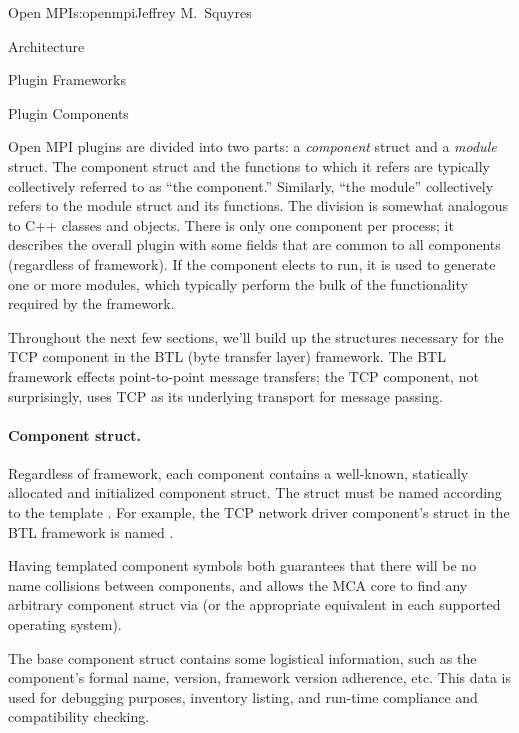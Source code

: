 \begin{aosachapter}{Open MPI}{s:openmpi}{Jeffrey M.\ Squyres}
\begin{aosasect1}{Architecture}
\begin{aosasect2}{Plugin Frameworks}
\end{aosasect2}


\begin{aosasect2}{Plugin Components}

Open MPI plugins are divided into two parts: a \emph{component}
struct and a \emph{module} struct.
%
The component struct and the functions to which it refers are
typically collectively referred to as ``the component.''  Similarly,
``the module'' collectively refers to the module struct and its
functions.
%
The division is somewhat analogous to C++ classes and objects.
%
There is only one component per process; it describes the overall
plugin with some fields that are common to all components (regardless
of framework).
%
If the component elects to run, it is used to generate one or more
modules, which typically perform the bulk of the functionality
required by the framework.

Throughout the next few sections, we'll build up the structures
necessary for the TCP component in the BTL (byte transfer layer)
framework.  The BTL framework effects point-to-point message transfers;
the TCP component, not surprisingly, uses TCP as its underlying
transport for message passing.


\paragraph{Component struct.} 

Regardless of framework, each component contains a well-known,
statically allocated and initialized component struct.  
%
The struct must be named according to the template 
.  For example, the
TCP network driver component's struct in the BTL framework is named
.

Having templated component symbols both guarantees that there will be
no name collisions between components, and allows the MCA core to find
any arbitrary component struct via  (or the appropriate
equivalent in each supported operating system).

The base component struct contains some logistical information, such
as the component's formal name, version, framework version adherence,
etc.
%
This data is used for debugging purposes, inventory listing, and
run-time compliance and compatibility checking.


\end{aosasect2}
\end{aosasect1}
\end{aosachapter}
